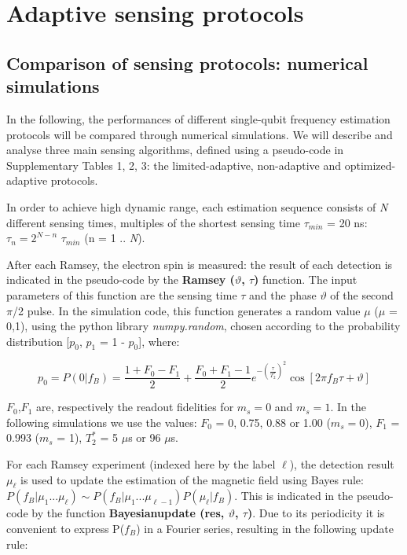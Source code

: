\documentclass{report}
\begin{document}
\graphicspath{{./ch_adptv_msmnt_cntrl_SI/figures/}}

\chapter[Adaptive sensing protocols]{Adaptive sensing protocols}
\label{ch:AMMappendix}

\section{Comparison of sensing protocols: numerical simulations}

In the following, the performances of different single-qubit frequency estimation protocols will be compared through numerical simulations. We will describe and analyse three main sensing algorithms, defined using a pseudo-code in Supplementary Tables 1, 2, 3: the limited-adaptive, non-adaptive and optimized-adaptive protocols.

In order to achieve high dynamic range, each estimation sequence consists of \textit{N} different sensing times, multiples of the shortest sensing time $\tau_{min}$ = 20 ns: $\tau_n = 2^{N-n}$ $\tau_{min}$ (n = 1 .. \textit{N}).

After each Ramsey, the electron spin is measured: the result of each detection is indicated in the pseudo-code by the \textbf{Ramsey ($\vartheta$, $\tau$) }function. The input parameters of this function are the sensing time $\tau$ and the phase $\vartheta$ of the second $\pi$/2 pulse. In the simulation code, this function generates a random value $\mu$ ($\mu$ = 0,1), using the python library \textit{numpy.random}, chosen according to the probability distribution [$p_0$, $p_1$ = 1 - $p_0$], where:

\begin{equation}
p_0 = P(0|f_B) = \frac{1+F_0-F_1}{2}+\frac{F_0+F_1-1}{2}e^{-(\frac{\tau}{T_2^*})^2} \cos{[2\pi f_B \tau + \vartheta]}
\end{equation}

$F_0$,$F_1$  are, respectively the readout fidelities for $m_s = 0$ and $m_s = 1$. In the following simulations we use the values: $F_0$ = 0, 0.75, 0.88 or 1.00 ($m_s = 0$), $F_1$  = 0.993 ($m_s$ = 1), $T_2^*$ = 5 $\mu$s  or 96 $\mu$s.

For each Ramsey experiment (indexed here by the label $\ell$), the detection result $\mu_{\ell}$  is used to update the estimation of the magnetic field using Bayes rule: $P(f_B|\mu_1... \mu_{\ell}) \sim P(f_B|\mu_1...\mu_{\ell -1}) P(\mu_{\ell}|f_B)$. This is indicated in the pseudo-code by the function \textbf{Bayesian\textunderscore update (res, $\vartheta$, $\tau$)}.
Due to its periodicity it is convenient to express P($f_B$) in a Fourier series, resulting in the following update rule:
\end{document}
